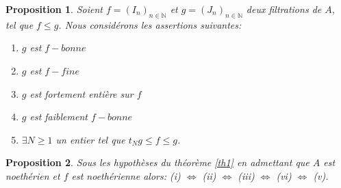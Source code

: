 \documentclass[12pt, a4paper, oneside]{book}
\newtheorem{maproposition}{Proposition}[chapter]
\begin{document}
\begin{maproposition}
	\label{th1}
	Soient $f=(I_n)_{n \in \mathbb{N}}$ et $g=(J_n)_{n \in \mathbb{N}}$ deux filtrations de $A$,\\ tel que $f \leqslant  g$. Nous considérons les assertions suivantes:\\
	\begin{enumerate}
			\item[(i)] $g$ est $f-bonne$
			
			\item[(ii)]  $g$ est $f-fine$
			
			\item[(iii)] $g$ est fortement entière sur $f$
			
			\item[(iv)] $g$ est faiblement $f-bonne$
			
			\item[(v)]  $\exists N \geqslant 1$ un entier tel que $t_Ng \leqslant f \leqslant g$.
		\end{enumerate}
\end{maproposition}
\begin{maproposition}
	Sous les hypothèses du théorème \eqref{th1} en admettant que $A$ est noethérien
	et $f$ est noethérienne alors:
	(i) $\Longleftrightarrow $ (ii) $\Longleftrightarrow $ (iii) $\Longleftrightarrow $ (vi) $\Longleftrightarrow $ (v). 
\end{maproposition}
\end{document}
